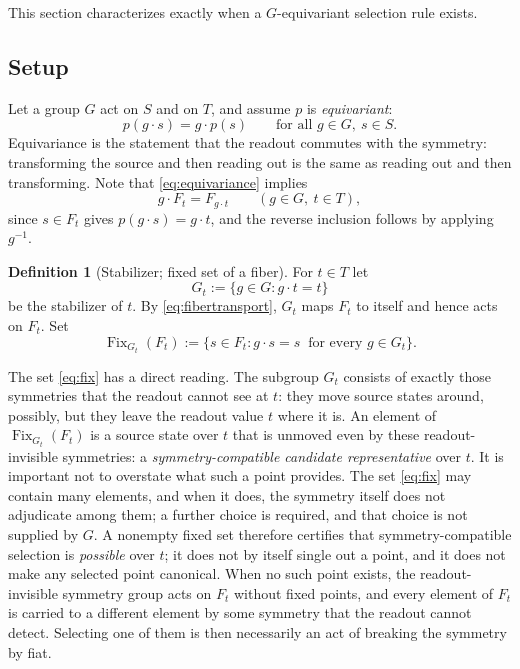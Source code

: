 \documentclass[11pt,reqno]{amsart}
\theoremstyle{plain}
\theoremstyle{definition}
\newtheorem{definition}[theorem]{Definition}
\theoremstyle{remark}
\DeclareMathOperator{\Fix}{Fix}
\begin{document}
This section characterizes exactly when a $G$-equivariant selection rule exists.

\subsection{Setup}

Let a group $G$ act on $S$ and on $T$, and assume $p$ is \emph{equivariant}:
\begin{equation}
\label{eq:equivariance}
p(g\cdot s)=g\cdot p(s)
\qquad\text{for all }g\in G,\ s\in S.
\end{equation}
Equivariance is the statement that the readout commutes with the symmetry: transforming the source and then reading out is the same as reading out and then transforming. Note that \eqref{eq:equivariance} implies
\begin{equation}
\label{eq:fibertransport}
g\cdot F_{t}=F_{g\cdot t}
\qquad (g\in G,\ t\in T),
\end{equation}
since $s\in F_{t}$ gives $p(g\cdot s)=g\cdot t$, and the reverse inclusion follows by applying $g^{-1}$.

\begin{definition}[Stabilizer; fixed set of a fiber]
\label{def:stab}
For $t\in T$ let
\begin{equation}
\label{eq:stab}
G_{t}:=\{g\in G: g\cdot t=t\}
\end{equation}
be the stabilizer of $t$. By \eqref{eq:fibertransport}, $G_{t}$ maps $F_{t}$ to itself and hence acts on $F_{t}$. Set
\begin{equation}
\label{eq:fix}
\Fix_{G_{t}}(F_{t}):=\{s\in F_{t}: g\cdot s=s\ \text{ for every } g\in G_{t}\}.
\end{equation}
\end{definition}

The set \eqref{eq:fix} has a direct reading. The subgroup $G_{t}$ consists of exactly those symmetries that the readout cannot see at $t$: they move source states around, possibly, but they leave the readout value $t$ where it is. An element of $\Fix_{G_{t}}(F_{t})$ is a source state over $t$ that is unmoved even by these readout-invisible symmetries: a \emph{symmetry-compatible candidate representative} over $t$. It is important not to overstate what such a point provides. The set \eqref{eq:fix} may contain many elements, and when it does, the symmetry itself does not adjudicate among them; a further choice is required, and that choice is not supplied by $G$. A nonempty fixed set therefore certifies that symmetry-compatible selection is \emph{possible} over $t$; it does not by itself single out a point, and it does not make any selected point canonical. When no such point exists, the readout-invisible symmetry group acts on $F_{t}$ without fixed points, and every element of $F_{t}$ is carried to a different element by some symmetry that the readout cannot detect. Selecting one of them is then necessarily an act of breaking the symmetry by fiat.
\end{document}
